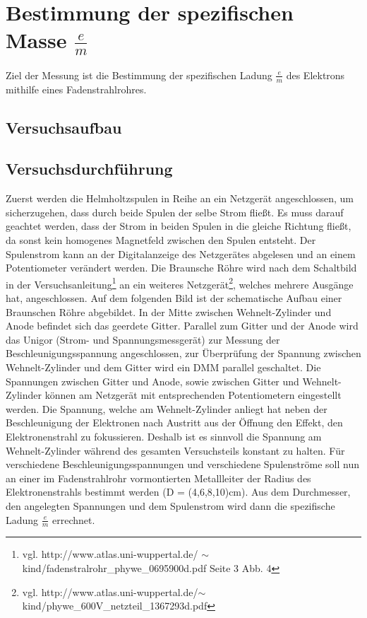 \documentclass[12pt,a4paper]{article}
\begin{document}
\section{Bestimmung der spezifischen Masse $\frac{e}{m}$}
Ziel der Messung ist die Bestimmung der spezifischen Ladung $\frac{e}{m}$ des Elektrons mithilfe eines Fadenstrahlrohres.
\subsection{Versuchsaufbau}
\subsection{Versuchsdurchführung}
Zuerst werden die Helmholtzspulen in Reihe an ein Netzgerät angeschlossen, um sicherzugehen, dass durch beide Spulen der selbe Strom fließt. Es muss darauf geachtet werden, dass der Strom in beiden Spulen in die gleiche Richtung fließt, da sonst kein homogenes Magnetfeld zwischen den Spulen entsteht. Der Spulenstrom kann an der Digitalanzeige des Netzgerätes abgelesen und an einem Potentiometer verändert werden. Die Braunsche Röhre wird nach dem Schaltbild in der Versuchsanleitung\footnote{vgl. http://www.atlas.uni-wuppertal.de/
$\sim$kind/fadenstralrohr\_phywe\_0695900d.pdf Seite 3 Abb. 4} an ein weiteres Netzgerät\footnote{vgl. http://www.atlas.uni-wuppertal.de/$\sim$kind/phywe\_600V\_netzteil\_1367293d.pdf}, welches mehrere Ausgänge hat, angeschlossen. Auf dem folgenden Bild ist der schematische Aufbau einer Braunschen Röhre abgebildet.
In der Mitte zwischen Wehnelt-Zylinder und Anode befindet sich das geerdete Gitter. Parallel zum Gitter und der Anode wird das Unigor (Strom- und Spannungsmessgerät) zur Messung der Beschleunigungsspannung angeschlossen, zur Überprüfung der Spannung zwischen Wehnelt-Zylinder und dem Gitter wird ein DMM parallel geschaltet. Die Spannungen zwischen Gitter und Anode, sowie zwischen Gitter und Wehnelt-Zylinder können am Netzgerät mit entsprechenden Potentiometern eingestellt werden. Die Spannung, welche am Wehnelt-Zylinder anliegt hat neben der Beschleunigung der Elektronen nach Austritt aus der Öffnung den Effekt, den Elektronenstrahl zu fokussieren. Deshalb ist es sinnvoll die Spannung am Wehnelt-Zylinder während des gesamten Versuchsteils konstant zu halten. Für verschiedene Beschleunigungsspannungen und verschiedene Spulenströme soll nun an einer im Fadenstrahlrohr vormontierten Metallleiter der Radius des Elektronenstrahls bestimmt werden (D = (4,6,8,10)cm). Aus dem Durchmesser, den angelegten Spannungen und dem Spulenstrom wird dann die spezifische Ladung $\frac{e}{m}$ errechnet.
\end{document}
